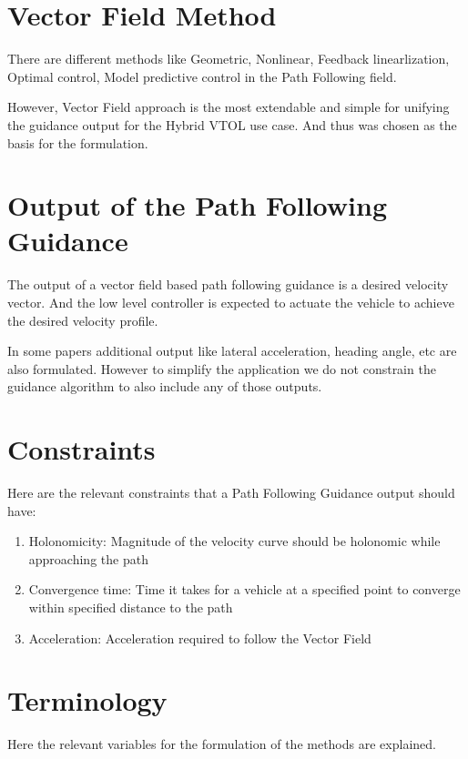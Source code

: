\documentclass[10pt,twoside,a4paper]{report}
\begin{document}
\section{Vector Field Method}

There are different methods like Geometric, Nonlinear, Feedback linearlization, Optimal control, Model predictive control in the Path Following field.

However, Vector Field approach is the most extendable and simple for unifying the guidance output for the Hybrid VTOL use case. And thus was chosen as the basis for the formulation.

\section{Output of the Path Following Guidance}

The output of a vector field based path following guidance is a desired velocity vector. And the low level controller is expected to actuate the vehicle to achieve the desired velocity profile.

In some papers additional output like lateral acceleration, heading angle, etc are also formulated. However to simplify the application we do not constrain the guidance algorithm to also include any of those outputs.

\section{Constraints}
Here are the relevant constraints that a Path Following Guidance output should have:

\begin{enumerate}
    \item Holonomicity: Magnitude of the velocity curve should be holonomic while approaching the path
    \item Convergence time: Time it takes for a vehicle at a specified point to converge within specified distance to the path
    \item Acceleration: Acceleration required to follow the Vector Field
\end{enumerate}

\section{Terminology}

Here the relevant variables for the formulation of the methods are explained.
\end{document}
